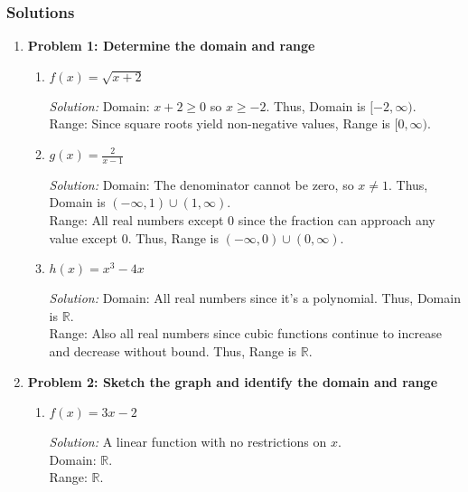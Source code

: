 \documentclass[a4paper,12pt]{book}
\newenvironment{solution}[1][]
{\par\noindent\textit{Solution:} \rmfamily}{\medskip}
\begin{document}
\subsubsection*{Solutions}
\begin{enumerate}
    \item \textbf{Problem 1: Determine the domain and range}
    \begin{enumerate}[label=(\alph*)]
        \item \( f(x) = \sqrt{x + 2} \)
        \begin{solution}
        Domain: \( x + 2 \geq 0 \) so \( x \geq -2 \). Thus, Domain is \( [-2, \infty) \).\\
        Range: Since square roots yield non-negative values, Range is \( [0, \infty) \).
        \end{solution}

        \item \( g(x) = \frac{2}{x - 1} \)
        \begin{solution}
        Domain: The denominator cannot be zero, so \( x \neq 1 \). Thus, Domain is \( (-\infty, 1) \cup (1, \infty) \).\\
        Range: All real numbers except 0 since the fraction can approach any value except 0. Thus, Range is \( (-\infty, 0) \cup (0, \infty) \).
        \end{solution}

        \item \( h(x) = x^3 - 4x \)
        \begin{solution}
        Domain: All real numbers since it's a polynomial. Thus, Domain is \( \mathbb{R} \).\\
        Range: Also all real numbers since cubic functions continue to increase and decrease without bound. Thus, Range is \( \mathbb{R} \).
        \end{solution}
    \end{enumerate}

    \item \textbf{Problem 2: Sketch the graph and identify the domain and range}
    \begin{enumerate}[label=(\alph*)]
        \item \( f(x) = 3x - 2 \)
        \begin{solution}
        A linear function with no restrictions on \( x \).\\
        Domain: \( \mathbb{R} \).\\
        Range: \( \mathbb{R} \).
        \end{solution}


\end{enumerate}
\end{enumerate}
\end{document}
